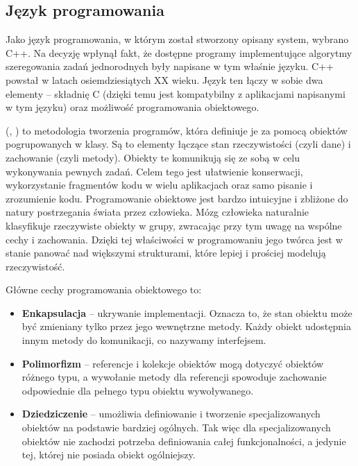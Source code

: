 \subsection{Język programowania}

Jako język programowania, w którym został stworzony opisany system, wybrano C++. Na decyzję wpłynął fakt, że dostępne programy implementujące 
algorytmy szeregowania zadań jednorodnych były napisane w tym właśnie języku.
C++ powstał w latach osiemdziesiątych XX wieku. Język ten łączy w sobie dwa elementy -- składnię C (dzięki temu jest kompatybilny z aplikacjami 
napisanymi w tym języku) oraz możliwość programowania obiektowego. 

 (, ) to metodologia tworzenia programów, która definiuje je za pomocą obiektów 
pogrupowanych w klasy. Są to elementy łączące stan rzeczywistości (czyli dane) i zachowanie (czyli metody). Obiekty te komunikują się ze sobą 
w celu wykonywania pewnych zadań. Celem tego jest ułatwienie konserwacji, wykorzystanie fragmentów kodu w wielu aplikacjach oraz samo 
pisanie i zrozumienie kodu. Programowanie obiektowe jest bardzo intuicyjne i zbliżone do natury postrzegania świata przez człowieka. 
Mózg człowieka naturalnie klasyfikuje rzeczywiste obiekty w grupy, zwracając przy tym uwagę na wspólne cechy i zachowania. Dzięki tej 
właściwości w programowaniu jego twórca jest w stanie panować nad większymi strukturami, które lepiej i prościej modelują rzeczywistość.

Główne cechy programowania obiektowego to:
\begin{itemize}
	\item \textbf{Enkapsulacja} -- ukrywanie implementacji. Oznacza to, że stan obiektu może być zmieniany tylko przez jego wewnętrzne metody. 
	Każdy obiekt udostępnia innym metody do komunikacji, co nazywamy interfejsem.
	\item \textbf{Polimorfizm} -- referencje i kolekcje obiektów mogą dotyczyć obiektów różnego typu, a wywołanie metody dla referencji spowoduje 
	zachowanie odpowiednie dla pełnego typu obiektu wywoływanego.
	\item \textbf{Dziedziczenie} -- umożliwia definiowanie i tworzenie specjalizowanych obiektów na podstawie bardziej ogólnych. Tak więc dla 
	specjalizowanych obiektów nie zachodzi potrzeba definiowania całej funkcjonalności, a jedynie tej, której nie posiada obiekt ogólniejszy.
\end{itemize}

